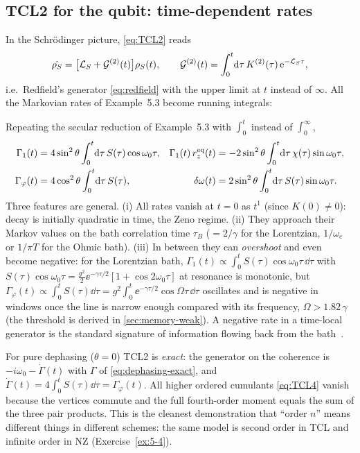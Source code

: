 \subsection{TCL2 for the qubit: time-dependent rates}

In the Schr\"odinger picture, \cref{eq:TCL2} reads
\begin{equation}
  \dot{\rho_{S}}=\big[\mathcal{L}_S+\mathcal{G}^{(2)}(t)\big]\rho_{S}(t),\qquad
  \mathcal{G}^{(2)}(t)=\int_0^t\!\mathrm{d}\tau\,K^{(2)}(\tau)\,\mathrm{e}^{-\mathcal{L}_S\tau},
  \label{eq:TCL2-S}
\end{equation}
i.e.\ Redfield's generator \eqref{eq:redfield} with the upper limit at $t$ instead of $\infty$.
All the Markovian rates of Example~5.3 become running integrals:

\begin{exbox}
Repeating the secular reduction of Example~5.3 with $\int_0^t$ instead of $\int_0^\infty$,
\begin{align}
  \Gamma_1(t)&=4\sin^2\theta\int_0^t\!\mathrm{d}\tau\,S(\tau)\cos\omega_0\tau ,&
  \Gamma_1(t)\,r_z^{\rm eq}(t)&=-2\sin^2\theta\int_0^t\!\mathrm{d}\tau\,\chi(\tau)\sin\omega_0\tau,\notag\\
  \Gamma_\varphi(t)&=4\cos^2\theta\int_0^t\!\mathrm{d}\tau\,S(\tau),&
  \delta\omega(t)&=2\sin^2\theta\int_0^t\!\mathrm{d}\tau\,S(\tau)\sin\omega_0\tau .
  \label{eq:running-rates}
\end{align}
Three features are general.
(i) All rates vanish at $t=0$ as $t^1$ (since $K(0)\ne0$): decay is initially quadratic in time, the Zeno regime.
(ii) They approach their Markov values on the bath correlation time $\tau_B$ ($=2/\gamma$ for the Lorentzian, $1/\omega_c$ or $1/\pi T$ for the Ohmic bath).
(iii) In between they can \emph{overshoot} and even become negative: for the Lorentzian bath, $\Gamma_1(t)\propto\int_0^tS(\tau)\cos\omega_0\tau\,\dd\tau$ with $S(\tau)\cos\omega_0\tau=\tfrac{g^2}2\ee^{-\gamma\tau/2}[1+\cos2\omega_0\tau]$ at resonance is monotonic, but $\Gamma_\varphi(t)\propto\int_0^tS(\tau)\dd\tau=g^2\int_0^t\ee^{-\gamma\tau/2}\cos\Omega\tau\,\dd\tau$ oscillates and is negative in windows once the line is narrow enough compared with its frequency, $\Omega>1.82\,\gamma$ (the threshold is derived in \cref{sec:memory-weak}).
A negative rate in a time-local generator is the standard signature of information flowing back from the bath~\cite{deVega2017}.
\end{exbox}

For pure dephasing ($\theta=0$) TCL2 is \emph{exact}: the generator on the coherence is $-i\omega_0-\dot\Gamma(t)$ with $\Gamma$ of \cref{eq:dephasing-exact}, and $\dot\Gamma(t)=4\int_0^tS(\tau)\dd\tau=\Gamma_\varphi(t)$.
All higher ordered cumulants \eqref{eq:TCL4} vanish because the vertices commute and the full fourth-order moment equals the sum of the three pair products.
This is the cleanest demonstration that ``order $n$'' means different things in different schemes: the same model is second order in TCL and infinite order in NZ (Exercise~\ref{ex:5-4}).

